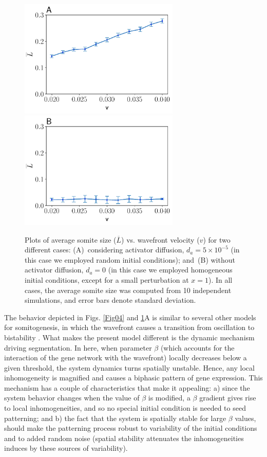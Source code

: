 \documentclass[%
 preprint,
 aip, 
 amsmath,amssymb,
]{revtex4-2}
\begin{document}
\begin{figure}
	\centering
	\includegraphics[width=3in]{Fig05a} 
	\includegraphics[width=3in]{Fig05b}
	\caption{Plots of average somite size ($\overline{L}$) vs. wavefront velocity ($v$) for two different cases: (A)~considering activator diffusion, $d_a = 5\times10^{-5}$ (in this case we employed random initial conditions); and~(B) without activator diffusion, $d_a = 0$ (in this case we employed homogeneous initial conditions, except for a small perturbation at $x=1$). In all cases, the average somite size was computed from 10 independent simulations, and error bars denote standard deviation.}
	\label{Fig04_1}
\end{figure}

The behavior depicted in Figs. \ref{Fig04} and \ref{Fig04_1}A is similar to several other models for somitogenesis, in which the wavefront causes a transition from oscillation to bistability \cite{Francois2007}. What makes the present model different is the dynamic mechanism driving segmentation. In here, when parameter $\beta$ (which accounts for the interaction of the gene network with the wavefront) locally decreases below a given threshold, the system dynamics turns spatially unstable. Hence, any local inhomogeneity is magnified and causes a biphasic pattern of gene expression. This mechanism has a couple of characteristics that make it appealing: a) since the system behavior changes when the value of $\beta$ is modified, a $\beta$ gradient gives rise to local inhomogeneities, and so no special initial condition is needed to seed patterning; and b) the fact that the system is spatially stable for large $\beta$ values, should make the patterning process robust to variability of the initial conditions and to added random noise (spatial stability attenuates the inhomogeneities induces by these sources of variability).
	
\end{document}
